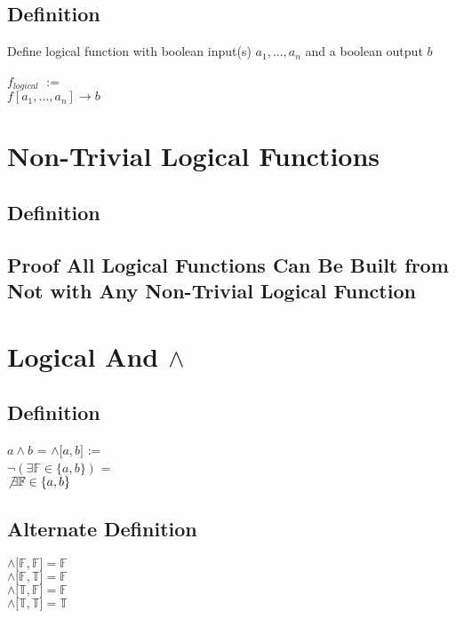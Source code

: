 \documentclass[11pt]{article}
\begin{document}
\subsection{Definition}
Define logical function with boolean input(s) $a_1,...,a_n$ and a boolean output $b$
\begin{center}
$f_{logical}$ $:=$\\
$f[a_1,...,a_n] \rightarrow b$
\end{center}




\section{Non-Trivial Logical Functions}
\subsection{Definition}
\subsection{Proof All Logical Functions Can Be Built from Not with Any Non-Trivial Logical Function}



\newpage
\section{Logical And $\land$}
\subsection{Definition}
\begin{center}
$a \land b$ = $\land \lbrack a,b \rbrack$ :=\\
$\lnot (\exists \mathbb{F} \in \{a,b\})$ =\\
$\not \exists \mathbb{F} \in \{a,b\}$
\end{center}
\subsection{Alternate Definition}
\begin{center}
$\land \lbrack \mathbb{F},\mathbb{F} \rbrack = \mathbb{F}$\\
$\land \lbrack \mathbb{F},\mathbb{T} \rbrack = \mathbb{F}$\\
$\land \lbrack \mathbb{T},\mathbb{F} \rbrack = \mathbb{F}$\\
$\land \lbrack \mathbb{T},\mathbb{T} \rbrack = \mathbb{T}$
\end{center}
\end{document}
